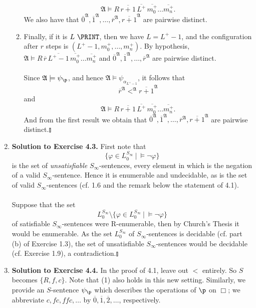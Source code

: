 \begin{enumerate}[1.]
\begin{enumerate}[1)]
\[\mathfrak{A} \models R \, \overline{r + 1} \, \overline{L^+} \, \overline{m_0^+} \ldots \overline{m_n^+}.
\]
We also have that $\overline{0}^\mathfrak{A}, \overline{1}^\mathfrak{A}, \ldots, \overline{r}^\mathfrak{A}, \overline{r + 1}^\mathfrak{A}$ are pairwise distinct.
\item Finally, if it is $L \ \PRINT$, then we have $L = L^+ - 1$, and the configuration after $r$ steps is $(L^+ - 1, m_0^+, \ldots, m_n^+)$. By hypothesis, $\mathfrak{A} \models R \, \overline{r} \, \overline{L^+ - 1} \, \overline{m_0^+} \ldots \overline{m_n^+}$ and $\overline{0}^\mathfrak{A}, \overline{1}^\mathfrak{A}, \ldots, \overline{r}^\mathfrak{A}$ are pairwise distinct.\\
\ \\
Since $\mathfrak{A} \models \psi_\p$, and hence $\mathfrak{A} \models \psi_{\alpha_{L^+ - 1}}$, it follows that
\[
\overline{r}^\mathfrak{A} <^\mathfrak{A} \overline{r + 1}^\mathfrak{A}
\]
and
\[
\mathfrak{A} \models R \, \overline{r + 1} \, \overline{L^+} \, \overline{m_0^+} \ldots \overline{m_n^+}.
\]
And from the first result we obtain that $\overline{0}^\mathfrak{A}, \overline{1}^\mathfrak{A}, \ldots, \overline{r}^\mathfrak{A}, \overline{r + 1}^\mathfrak{A}$ are pairwise distinct.\nolinebreak\hfill$\talloblong$
\end{enumerate}
%
\item \textbf{Solution to Exercise 4.3.} First note that 
\[
\{ \varphi \in L_0^{S_\infty} \ | \ \models \neg\varphi \}
\]
is the set of \emph{unsatisfiable} $S_\infty$-sentences, every element in which is the negation of a valid $S_\infty$-sentence. Hence it is enumerable and undecidable, as is the set of valid $S_\infty$-sentences (cf. 1.6 and the remark below the statement of 4.1).\\
\ \\
Suppose that the set
\[
L_0^{S_\infty} \setminus \{ \varphi \in L_0^{S_\infty} \ | \ \models \neg\varphi \}
\]
of satisfiable $S_\infty$-sentences were R-enumerable, then by Church's Thesis it would be enumerable. As the set $L_0^{S_\infty}$ of $S_\infty$-sentences is decidable (cf. part (b) of Exercise 1.3), the set of unsatisfiable $S_\infty$-sentences would be decidable (cf. Exercise 1.9), a contradiction.\nolinebreak\hfill$\talloblong$
%
\item \textbf{Solution to Exercise 4.4.} In the proof of 4.1, leave out $<$ entirely. So $S$ becomes $\{ R, f, c \}$. Note that (1) also holds in this new setting. Similarly, we provide an $S$-sentence $\psi_\p$ which describes the operations of $\p$ on $\Box$; we abbreviate $c, fc, ffc, \ldots$ by $\overline{0}, \overline{1}, \overline{2}, \ldots$, respectively.\\

\end{enumerate}
